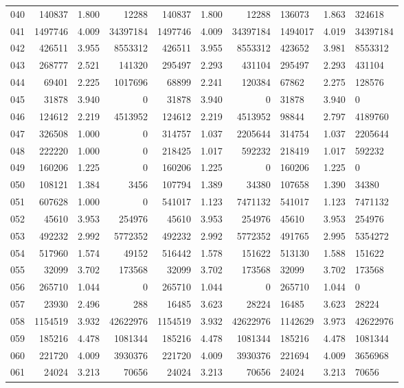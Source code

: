 \begin{longtable}{crrrrrr}
040 & 140837 & 1.800 & 12288 & 140837 & 1.800 & 12288 & 136073 & 1.863 & 324618 \\
041 & 1497746 & 4.009 & 34397184 & 1497746 & 4.009 & 34397184 & 1494017 & 4.019 & 34397184 \\
042 & 426511 & 3.955 & 8553312 & 426511 & 3.955 & 8553312 & 423652 & 3.981 & 8553312 \\
043 & 268777 & 2.521 & 141320 & 295497 & 2.293 & 431104 & 295497 & 2.293 & 431104 \\
044 & 69401 & 2.225 & 1017696 & 68899 & 2.241 & 120384 & 67862 & 2.275 & 128576 \\
045 & 31878 & 3.940 & 0 & 31878 & 3.940 & 0 & 31878 & 3.940 & 0 \\
046 & 124612 & 2.219 & 4513952 & 124612 & 2.219 & 4513952 & 98844 & 2.797 & 4189760 \\
047 & 326508 & 1.000 & 0 & 314757 & 1.037 & 2205644 & 314754 & 1.037 & 2205644 \\
048 & 222220 & 1.000 & 0 & 218425 & 1.017 & 592232 & 218419 & 1.017 & 592232 \\
049 & 160206 & 1.225 & 0 & 160206 & 1.225 & 0 & 160206 & 1.225 & 0 \\
050 & 108121 & 1.384 & 3456 & 107794 & 1.389 & 34380 & 107658 & 1.390 & 34380 \\
051 & 607628 & 1.000 & 0 & 541017 & 1.123 & 7471132 & 541017 & 1.123 & 7471132 \\
052 & 45610 & 3.953 & 254976 & 45610 & 3.953 & 254976 & 45610 & 3.953 & 254976 \\
053 & 492232 & 2.992 & 5772352 & 492232 & 2.992 & 5772352 & 491765 & 2.995 & 5354272 \\
054 & 517960 & 1.574 & 49152 & 516442 & 1.578 & 151622 & 513130 & 1.588 & 151622 \\
055 & 32099 & 3.702 & 173568 & 32099 & 3.702 & 173568 & 32099 & 3.702 & 173568 \\
056 & 265710 & 1.044 & 0 & 265710 & 1.044 & 0 & 265710 & 1.044 & 0 \\
057 & 23930 & 2.496 & 288 & 16485 & 3.623 & 28224 & 16485 & 3.623 & 28224 \\
058 & 1154519 & 3.932 & 42622976 & 1154519 & 3.932 & 42622976 & 1142629 & 3.973 & 42622976 \\
059 & 185216 & 4.478 & 1081344 & 185216 & 4.478 & 1081344 & 185216 & 4.478 & 1081344 \\
060 & 221720 & 4.009 & 3930376 & 221720 & 4.009 & 3930376 & 221694 & 4.009 & 3656968 \\
061 & 24024 & 3.213 & 70656 & 24024 & 3.213 & 70656 & 24024 & 3.213 & 70656 \\

\end{longtable}
